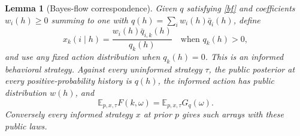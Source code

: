 \documentclass[11pt,a4paper]{article}
\newtheorem{lemma}[theorem]{Lemma}
\theoremstyle{definition}
\newcommand{\E}{\mathbb E}
\begin{document}
\begin{lemma}[Bayes-flow correspondence]\label{bayes}
Given $q$ satisfying \eqref{bf} and coefficients $w_i(h)\geq0$ summing
to one with $q(h)=\sum_i w_i(h)\bar q_i(h)$, define
\[
 x_k(i\mid h)=\frac{w_i(h)\bar q_{i,k}(h)}{q_k(h)}
 \quad\text{when }q_k(h)>0,
\]
and use any fixed action distribution when $q_k(h)=0$. This is an
informed behavioral strategy. Against every uninformed strategy $\tau$,
the public posterior at every positive-probability history is $q(h)$,
the informed action has public distribution $w(h)$, and
\begin{equation}
 \E_{p,x,\tau}F(k,\omega)=\E_{p,x,\tau}G_q(\omega).
 \tag{PI}\label{pi}
\end{equation}
Conversely every informed strategy $x$ at prior $p$ gives such arrays
with these public laws.
\end{lemma}
\end{document}
